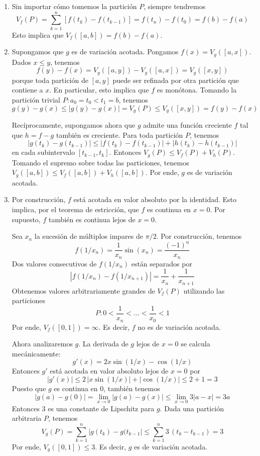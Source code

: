 \begin{solution}
\leavevmode
\begin{enumerate}[label=(\alph*)]
    \item Sin importar cómo tomemos la partición $P$, siempre tendremos
    $$V_f(P) = \sum_{k=1}^n [f(t_k) - f(t_{k-1})] = f(t_n) - f(t_0) = f(b) - f(a)$$
    Esto implica que $V_f([a,b]) = f(b) - f(a)$.
    
    \item Supongamos que $g$ es de variación acotada. Pongamos $f(x) = V_g([a,x])$. Dados $x \le y$, tenemos
    $$f(y) - f(x) = V_g([a,y]) - V_g([a,x]) = V_g([x,y])$$
    porque toda partición de $[a,y]$ puede ser refinada por otra partición que contiene a $x$. En particular, esto implica que $f$ es monótona. Tomando la partición trivial $P : a_0 = t_0 < t_1 = b$, tenemos
    $$g(y) - g(x) \le |g(y) - g(x)| = V_g(P) \le V_g([x, y]) = f(y) - f(x)$$
    
    Recíprocamente, supongamos ahora que $g$ admite una función creciente $f$ tal que $h = f-g$ también es creciente. Para toda partición $P$, tenemos
    $$|g(t_k) - g(t_{k-1})| \le |f(t_k) - f(t_{k-1})| + |h(t_k) - h(t_{k-1})|$$
    en cada subintervalo $[t_{k-1}, t_k]$. Entonces $V_g(P) \le V_f(P) + V_h(P)$. Tomando el supremo sobre todas las particiones, tenemos $V_g([a,b]) \le V_f([a,b]) + V_h([a,b])$. Por ende, $g$ es de variación acotada.
    
    \item Por construcción, $f$ está acotada en valor absoluto por la identidad. Esto implica, por el teorema de estricción, que $f$ es continua en $x = 0$. Por supuesto, $f$ también es continua lejos de $x = 0$.
    
    Sea $x_n$ la sucesión de múltiplos impares de $\pi/2$. Por construcción, tenemos
    $$f(1 / x_n) = \frac 1 {x_n} \sin(x_n) = \frac {(-1)^n} {x_n}$$
    Dos valores consecutivos de $f(1 / x_n)$ están separados por
    $$|f(1 / x_n) - f(1 / x_{n+1})| = \frac 1 {x_n} + \frac 1 {x_{n+1}}$$
    Obtenemos valores arbitrariamente grandes de $V_f(P)$ utilizando las particiones
    $$P : 0 < \frac 1 {x_n} < \dots < \frac 1 {x_0} < 1$$
    Por ende, $V_f([0,1]) = \infty$. Es decir, $f$ no es de variación acotada.
    
    Ahora analizaremos $g$. La derivada de $g$ lejos de $x = 0$ se calcula mecánicamente:
    $$g'(x) = 2x \sin(1/x) - \cos(1/x)$$
    Entonces $g'$ está acotada en valor absoluto lejos de $x = 0$ por
    $$|g'(x)| \le 2 \, |x \sin(1/x)| + \lvert \cos(1/x) \rvert \le 2 + 1 = 3$$
    Puesto que $g$ es continua en $0$, también tenemos
    $$|g(a) - g(0)| = \lim_{x \to 0} |g(a) - g(x)| \le \lim_{x \to 0} 3 |a - x| = 3a$$
    Entonces $3$ es una constante de Lipschitz para $g$. Dada una partición arbitraria $P$, tenemos
    $$V_g(P) = \sum_{k=1}^n |g(t_k) - g(t_{k-1}| \le \sum_{k=1}^n 3 \, (t_k - t_{k-1}) = 3$$
    Por ende, $V_g([0,1]) \le 3$. Es decir, $g$ es de variación acotada.
    

\end{enumerate}
\end{solution}
